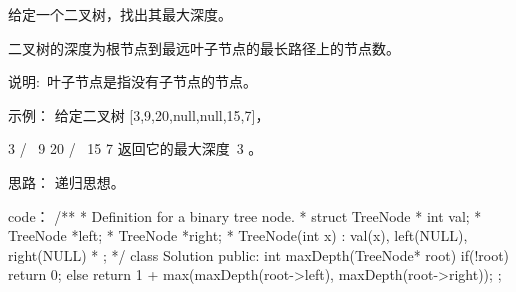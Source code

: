 给定一个二叉树，找出其最大深度。

二叉树的深度为根节点到最远叶子节点的最长路径上的节点数。

说明: 叶子节点是指没有子节点的节点。

示例：
给定二叉树 [3,9,20,null,null,15,7]，

    3
   / \
  9  20
    /  \
   15   7
返回它的最大深度 3 。



























思路：
递归思想。


























code：
/**
 * Definition for a binary tree node.
 * struct TreeNode {
 *     int val;
 *     TreeNode *left;
 *     TreeNode *right;
 *     TreeNode(int x) : val(x), left(NULL), right(NULL) {}
 * };
 */
class Solution {
public:
    int maxDepth(TreeNode* root) {
        if(!root) return 0;
        else return 1 + max(maxDepth(root->left), maxDepth(root->right));
    }
};